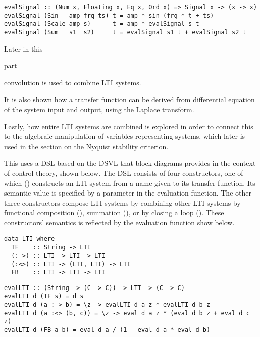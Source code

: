 
\begin{verbatim}
evalSignal :: (Num x, Floating x, Eq x, Ord x) => Signal x -> (x -> x)
evalSignal (Sin   amp frq ts) t = amp * sin (frq * t + ts)
evalSignal (Scale amp s)      t = amp * evalSignal s t
evalSignal (Sum   s1  s2)     t = evalSignal s1 t + evalSignal s2 t
\end{verbatim}

\noindent
Later in this 
\begin{modtext}
part %
\end{modtext}
convolution is used to combine \gls{LTI} systems. 
\begin{modtext}
It is also shown how a transfer function can be derived from differential equation of the system input and output, using the Laplace transform.
\end{modtext}

Lastly, how entire LTI systems are combined is explored in order to connect this to the algebraic manipulation of variables representing systems, which later is used in the section on the Nyquist stability criterion. 
\begin{newtext}
This uses a \gls{DSL} based on the \gls{DSVL} that block diagrams provides in the context of control theory, shown below. The \gls{DSL} consists of four constructors, one of which () constructs an \gls{LTI} system from a name given to its transfer function. Its semantic value is specified by a parameter in the evaluation function. The other three constructors compose \gls{LTI} systems by combining other \gls{LTI} systems by functional composition (\cmd{:->}), summation (\cmd{:<>}), or by closing a loop (). These constructors' semantics is reflected by the evaluation function show below.

\begin{verbatim}
data LTI where
  TF    :: String -> LTI
  (:->) :: LTI -> LTI -> LTI
  (:<>) :: LTI -> (LTI, LTI) -> LTI
  FB    :: LTI -> LTI -> LTI
\end{verbatim}

\begin{verbatim}
evalLTI :: (String -> (C -> C)) -> LTI -> (C -> C)
evalLTI d (TF s) = d s
evalLTI d (a :-> b) = \z -> evalLTI d a z * evalLTI d b z
evalLTI d (a :<> (b, c)) = \z -> eval d a z * (eval d b z + eval d c z)
evalLTI d (FB a b) = eval d a / (1 - eval d a * eval d b)
\end{verbatim}
\end{newtext}

